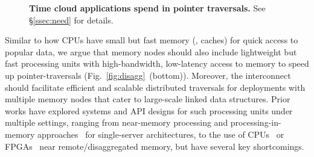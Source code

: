 \begin{figure}[ht!]
    \centering
    \vspace{-1em}
    \caption{\textbf{Time cloud applications spend in pointer traversals.} See \S\ref{ssec:need} for details.} 
    \label{fig:motivation}%
\end{figure}


Similar to how CPUs have small but fast memory (\ie, caches) for quick access to popular data, we argue that memory nodes should also include lightweight but fast processing units with high-bandwidth, low-latency access to memory to speed up pointer-traversals (Fig.~\ref{fig:disagg}~(bottom)). Moreover, the interconnect should facilitate efficient and scalable distributed traversals for deployments with multiple memory nodes that cater to large-scale linked data structures. Prior works have explored systems and API designs for such processing units under multiple settings, ranging from near-memory processing and processing-in-memory approaches~\cite{ahn2015scalable, asghari2016chameleon,  dai2018graphh, schuiki2018scalable, mutlu2019processing, lockerman2020livia, tu2022redcim, devic2022_PIM, wang2022_Nearstream, xie2023mpu, mutlu2022modern, oliveira2022accelerating, eckert2022eidetic, chi2016prime, seshadri2017simple, kwon2019_TensorDIMM, boroumand2019_codna, cho2020_data, ke2020_RecNMP, wang2021stream, xie2021spacea, ke2021near, singh2021fpga, olgun2022pidram, dai2022dimmining, gu2020ipim, gomez2023evaluating, walkers, impica} for single-server architectures, to the use of CPUs~\cite{storagefunctions, splinter, aifm, kayak_nsdi_21, storm_systor_19, zhang2022_teleport} or FPGAs~\cite{clio, strom} near remote/disaggregated memory, but have several key shortcomings. 


